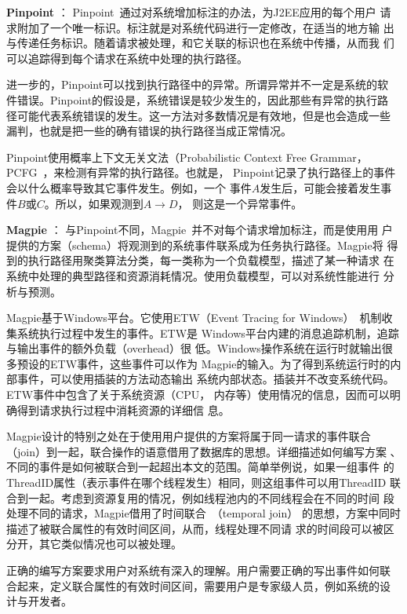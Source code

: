 
\textbf{Pinpoint} ：
Pinpoint~\cite{pinpoint}通过对系统增加标注的办法，为J2EE应用的每个用户
请求附加了一个唯一标识。标注就是对系统代码进行一定修改，在适当的地方输
出与传递任务标识。随着请求被处理，和它关联的标识也在系统中传播，从而我
们可以追踪得到每个请求在系统中处理的执行路径。

进一步的，Pinpoint可以找到执行路径中的异常。所谓异常并不一定是系统的软
件错误。Pinpoint的假设是，系统错误是较少发生的，因此那些有异常的执行路
径可能代表系统错误的发生。这一方法对多数情况是有效地，但是也会造成一些
漏判，也就是把一些的确有错误的执行路径当成正常情况。

Pinpoint使用概率上下文无关文法（Probabilistic Context Free
Grammar，PCFG~\cite{Manning1999}，来检测有异常的执行路径。也就是，
Pinpoint记录了执行路径上的事件会以什么概率导致其它事件发生。例如，一个
事件$A$发生后，可能会接着发生事件$B$或$C$。所以，如果观测到$A \to D$，
则这是一个异常事件。

\textbf{Magpie} ：
与Pinpoint不同，Magpie~\cite{magpie}并不对每个请求增加标注，而是使用用
户提供的方案（schema）将观测到的系统事件联系成为任务执行路径。Magpie将
得到的执行路径用聚类算法分类，每一类称为一个负载模型，描述了某一种请求
在系统中处理的典型路径和资源消耗情况。使用负载模型，可以对系统性能进行
分析与预测。

Magpie基于Windows平台。它使用ETW（Event Tracing for
Windows）~\cite{etw, Park2003}机制收集系统执行过程中发生的事件。ETW是
Windows平台内建的消息追踪机制，追踪与输出事件的额外负载（overhead）很
低。Windows操作系统在运行时就输出很多预设的ETW事件，这些事件可以作为
Magpie的输入。为了得到系统运行时的内部事件，可以使用插装的方法动态输出
系统内部状态。插装并不改变系统代码。ETW事件中包含了关于系统资源（CPU，
内存等）使用情况的信息，因而可以明确得到请求执行过程中消耗资源的详细信
息。

Magpie设计的特别之处在于使用用户提供的方案将属于同一请求的事件联合
（join）到一起，联合操作的语意借用了数据库的思想。详细描述如何编写方案
、不同的事件是如何被联合到一起超出本文的范围。简单举例说，如果一组事件
的ThreadID属性（表示事件在哪个线程发生）相同，则这组事件可以用ThreadID
联合到一起。考虑到资源复用的情况，例如线程池内的不同线程会在不同的时间
段处理不同的请求，Magpie借用了时间联合~\cite{Gao2005}（temporal join）
的思想，方案中同时描述了被联合属性的有效时间区间，从而，线程处理不同请
求的时间段可以被区分开，其它类似情况也可以被处理。

正确的编写方案要求用户对系统有深入的理解。用户需要正确的写出事件如何联
合起来，定义联合属性的有效时间区间，需要用户是专家级人员，例如系统的设
计与开发者。

